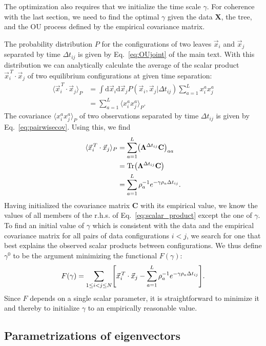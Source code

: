 \documentclass[preprint,amsmath,amssymb,superscriptaddress,showpacs,pre]{revtex4-1}
\let\originalleft\left
\let\originalright\right
\renewcommand{\left}{\mathopen{}\mathclose\bgroup\originalleft}
\renewcommand{\right}{\aftergroup\egroup\originalright}
\def\vx{\vec x}
\DeclareMathOperator{\Tr}{Tr}
\newcommand{\ddroit}{\textrm{d}}
\newcommand{\Lam}{\bm{\Lambda}}
\begin{document}
The optimization also requires that we initialize the time scale $\gamma$. For coherence with the last section, we need to find the optimal $\gamma$ given the data $\mathbf{X}$, the tree, and the OU process defined by the empirical covariance matrix. 

The probability distribution $P$ for the configurations of two leaves $\vx_i$ and  $\vx_j$  separated by time $\Delta t_{ij}$ is given by Eq.~\eqref{eq:OUjoint} of the main text. With this distribution we can analytically calculate the average of the scalar product $\vx_i^{\,T}\cdot\vx_j$ of two equilibrium configurations at given time separation:
\begin{align}
\langle \vx_i^{\,T}\cdot\vx_j \rangle_P &= \int \ddroit \vx_i \ddroit \vx_j P(\vx_i,\vx_j|\Delta t_{ij}) \sum_{a=1}^L   x_i^{a}x_j^{a}  \nonumber \\
	&=\sum_{a=1}^L \langle  x_i^{a} x_j^a \rangle_{P}.
\end{align}
The covariance $\langle  x_i^{a} x_j^a \rangle_{P}$ of two observations separated by time $\Delta t_{ij}$ is given by Eq.~\eqref{eq:pairwisecov}. Using this, we find
\begin{align}
		\nonumber\langle \vx_i^{\,T}\cdot\vx_j \rangle_P &= \sum_{a=1}^L \left( \Lam^{\Delta t_{ij}} \mathbf{C} \right)_{aa}\\
		\nonumber&= \Tr\left( \Lam^{\Delta t_{ij}} \mathbf{C} \right)\\
		&= \sum_{a=1}^L \rho_a^{-1}e^{-\gamma\rho_a\Delta t_{ij}}.
		\label{eq:scalar_product}
\end{align}
Having initialized the covariance matrix $\mathbf{C}$ with its empirical value, we know the values of all members of the r.h.s. of Eq.~\eqref{eq:scalar_product} except the one of $\gamma$. To find an initial value of $\gamma$ which is consistent with the data and the empirical covariance matrix for all pairs of data configurations $i<j$, we search for one that best explains the observed scalar products between configurations. We thus define $\gamma^0$ to be the argument minimizing the functional $F(\gamma)$: 
\begin{equation}
    F(\gamma) = \sum_{1\leq i<j\leq N}\left[ \vx_i^{\,T}\cdot\vx_j - \sum_{a=1}^L \rho_a^{-1}e^{-\gamma\rho_a\Delta t_{ij}} \right].
\end{equation} 
Since $F$ depends on a single scalar parameter, it is straightforward to minimize it and thereby to initialize $\gamma$ to an empirically reasonable value.

\subsection{Parametrizations of  eigenvectors } %
\label{sub:parametrizations_of_eigenvectors}
\end{document}
